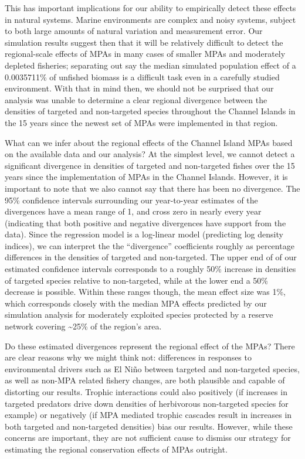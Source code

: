 \documentclass[twoside,12pt,final]{ucthesis-CA2012}
\begin{document}
\begin{ucmainmatter}
This has important implications for our ability to empirically detect
these effects in natural systems. Marine environments are complex and
noisy systems, subject to both large amounts of natural variation and
measurement error. Our simulation results suggest then that it will be
relatively difficult to detect the regional-scale effects of MPAs in
many cases of smaller MPAs and moderately depleted fisheries; separating
out say the median simulated population effect of a 0.0035711\% of
unfished biomass is a difficult task even in a carefully studied
environment. With that in mind then, we should not be surprised that our
analysis was unable to determine a clear regional divergence between the
densities of targeted and non-targeted species throughout the Channel
Islands in the 15 years since the newest set of MPAs were implemented in
that region.

What can we infer about the regional effects of the Channel Island MPAs
based on the available data and our analysis? At the simplest level, we
cannot detect a significant divergence in densities of targeted and
non-targeted fishes over the 15 years since the implementation of MPAs
in the Channel Islands. However, it is important to note that we also
cannot say that there has been no divergence. The 95\% confidence
intervals surrounding our year-to-year estimates of the divergences have
a mean range of 1, and cross zero in nearly every year (indicating that
both positive and negative divergences have support from the data).
Since the regression model is a log-linear model (predicting log density
indices), we can interpret the the ``divergence'' coefficients roughly
as percentage differences in the densities of targeted and non-targeted.
The upper end of of our estimated confidence intervals corresponds to a
roughly 50\% increase in densities of targeted species relative to
non-targeted, while at the lower end a 50\% decrease is possible. Within
these ranges though, the mean effect size was 1\%, which corresponds
closely with the median MPA effects predicted by our simulation analysis
for moderately exploited species protected by a reserve network covering
\textasciitilde{}25\% of the region's area.

Do these estimated divergences represent the regional effect of the
MPAs? There are clear reasons why we might think not: differences in
responses to environmental drivers such as El Niño between targeted and
non-targeted species, as well as non-MPA related fishery changes, are
both plausible and capable of distorting our results. Trophic
interactions could also positively (if increases in targeted predators
drive down densities of herbivorous non-targeted species for example) or
negatively (if MPA mediated trophic cascades result in increases in both
targeted and non-targeted densities) bias our results. However, while
these concerns are important, they are not sufficient cause to dismiss
our strategy for estimating the regional conservation effects of MPAs
outright.


\end{ucmainmatter}
\end{document}
